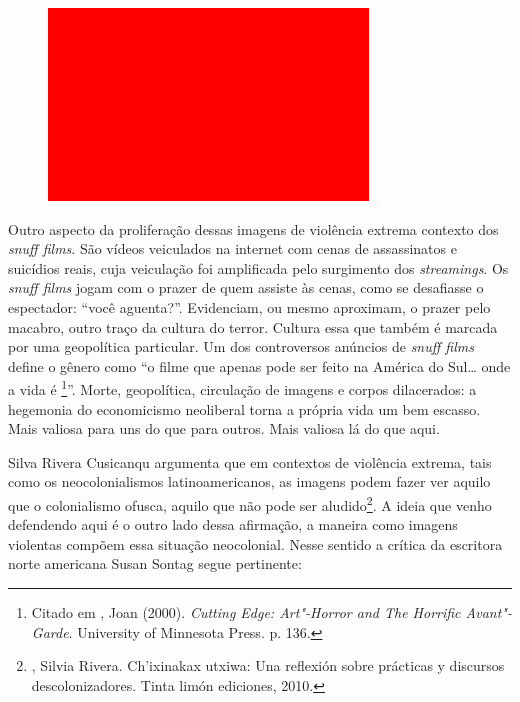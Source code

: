 \begin{figure}[!ht]
\centering
 \includegraphics[width=85mm]{./imgs/im1.jpg}
\caption{\footnotesize{}}
\end{figure}


\asterisc

Outro aspecto da proliferação dessas imagens de violência extrema
contexto dos \emph{snuff films}. São vídeos veiculados na internet com
cenas de assassinatos e suicídios reais, cuja veiculação foi amplificada
pelo surgimento dos \emph{streamings}. Os \emph{snuff films} jogam com o
prazer de quem assiste às cenas, como se desafiasse o espectador: ``você
aguenta?''. Evidenciam, ou mesmo aproximam, o prazer pelo macabro, outro
traço da cultura do terror. Cultura essa que também é marcada por uma
geopolítica particular. Um dos controversos anúncios de \emph{snuff
films} define o gênero como ``o filme que apenas pode ser feito na
América do Sul\ldots{} onde a vida é \footnote{Citado em ,
  Joan (2000). \emph{Cutting Edge: Art"-Horror and The Horrific
  Avant"-Garde}. University of Minnesota Press. p. 136.}''. Morte,
geopolítica, circulação de imagens e corpos dilacerados: a hegemonia do
economicismo neoliberal torna a própria vida um bem escasso. Mais
valiosa para uns do que para outros. Mais valiosa lá do que aqui.

\asterisc

Silva Rivera Cusicanqu argumenta que em contextos de violência extrema,
tais como os neocolonialismos latinoamericanos, as imagens podem fazer
ver aquilo que o colonialismo ofusca, aquilo que não pode ser
aludido\footnote{, Silvia Rivera. Ch'ixinakax utxiwa: Una
  reflexión sobre prácticas y discursos descolonizadores. Tinta limón
  ediciones, 2010.}. A ideia que venho defendendo aqui é o outro lado
dessa afirmação, a maneira como imagens violentas compõem essa situação
neocolonial. Nesse sentido a crítica da escritora norte americana Susan
Sontag segue pertinente:

